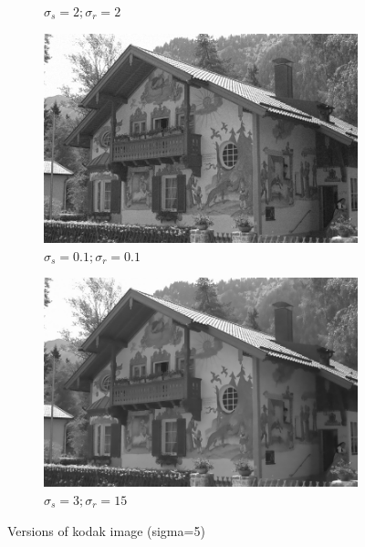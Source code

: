 \documentclass[12pt]{article}
\begin{document}
\begin{figure}[h]
\begin{subfigure}[b]{0.24\textwidth}
        \caption{$\sigma_s=2;\sigma_r=2$}
        \label{fig:subfig2}
    \end{subfigure}
    \begin{subfigure}[b]{0.24\textwidth}
        \centering
        \includegraphics[width=\textwidth]{../images/filtered_kodak_5_sigma_s_0.1_sigma_r_0.1.png}
        \caption{$\sigma_s=0.1;\sigma_r=0.1$}
        \label{fig:subfig3}
    \end{subfigure}
    \begin{subfigure}[b]{0.24\textwidth}
        \centering
        \includegraphics[width=\textwidth]{../images/filtered_kodak_5_sigma_s_3_sigma_r_15.png}
        \caption{$\sigma_s=3;\sigma_r=15$}
        \label{fig:subfig3}
    \end{subfigure}
    
    \caption{Versions of kodak image (sigma=5)}
    \label{fig:overall}
\end{figure}
\end{document}
